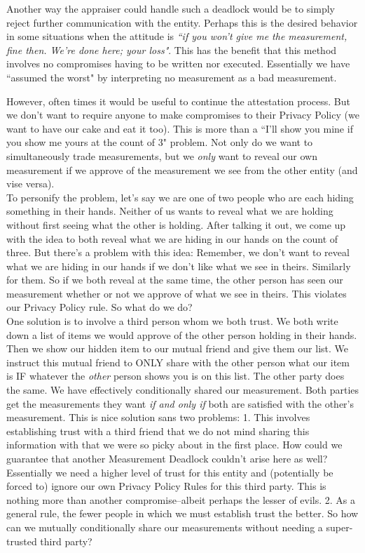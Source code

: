 \documentclass[10pt,a4paper,tikz]{article}
\begin{document}
Another way the appraiser could handle such a deadlock would be to simply reject further communication with the entity. Perhaps this is the desired behavior in some situations when the attitude is \textit{``if you won't give me the measurement, fine then. We're done here; your loss"}. This has the benefit that this method involves no compromises having to be written nor executed. Essentially we have ``assumed the worst" by interpreting no measurement as a bad measurement. 

However, often times it would be useful to continue the attestation process. But we don't want to require anyone to make compromises to their Privacy Policy (we want to have our cake and eat it too). This is more than a ``I'll show you mine if you show me yours at the count of 3" problem. Not only do we want to simultaneously trade measurements, but we \textit{only} want to reveal our own measurement if we approve of the measurement we see from the other entity (and vise versa). 
\\

To personify the problem, let's say we are one of two people who are each hiding something in their hands. Neither of us wants to reveal what we are holding without first seeing what the other is holding. After talking it out, we come up with the idea to both reveal what we are hiding in our hands on the count of three. But there's a problem with this idea: Remember, we don't want to reveal what we are hiding in our hands if we don't like what we see in theirs. Similarly for them. So if we both reveal at the same time, the other person has seen our measurement whether or not we approve of what we see in theirs. This violates our Privacy Policy rule. So what do we do?
\\

One solution is to involve a third person whom we both trust. We both write down a list of items we would approve of the other person holding in their hands. Then we show our hidden item to our mutual friend and give them our list. We instruct this mutual friend to ONLY share with the other person what our item is IF whatever the \textit{other} person shows you is on this list. The other party does the same. We have effectively conditionally shared our measurement. Both parties get the measurements they want \textit{if and only if} both are satisfied with the other's measurement. This is nice solution sans two problems: 1. This involves establishing trust with a third friend that we do not mind sharing this information with that we were so picky about in the first place. How could we guarantee that another Measurement Deadlock couldn't arise here as well? Essentially we need a higher level of trust for this entity and (potentially be forced to) ignore our own Privacy Policy Rules for this third party. This is nothing more than another compromise--albeit perhaps the lesser of evils. 2. As a general rule, the fewer people in which we must establish trust the better. So how can we mutually conditionally share our measurements without needing a super-trusted third party?
\\
\end{document}
